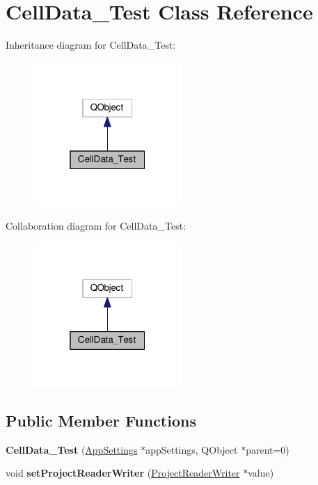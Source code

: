 \hypertarget{class_cell_data___test}{}\section{Cell\+Data\+\_\+\+Test Class Reference}
\label{class_cell_data___test}


Inheritance diagram for Cell\+Data\+\_\+\+Test\+:
\nopagebreak
\begin{figure}[H]
\begin{center}
\leavevmode
\includegraphics[width=160pt]{class_cell_data___test__inherit__graph}
\end{center}
\end{figure}


Collaboration diagram for Cell\+Data\+\_\+\+Test\+:
\nopagebreak
\begin{figure}[H]
\begin{center}
\leavevmode
\includegraphics[width=160pt]{class_cell_data___test__coll__graph}
\end{center}
\end{figure}
\subsection*{Public Member Functions}
\begin{DoxyCompactItemize}
\item 
{\bfseries Cell\+Data\+\_\+\+Test} (\hyperlink{class_app_settings}{App\+Settings} $\ast$app\+Settings, Q\+Object $\ast$parent=0)\hypertarget{class_cell_data___test_a90979511947668d5a7f6dc56ec19b0d8}{}\label{class_cell_data___test_a90979511947668d5a7f6dc56ec19b0d8}

\item 
void {\bfseries set\+Project\+Reader\+Writer} (\hyperlink{class_project_reader_writer}{Project\+Reader\+Writer} $\ast$value)\hypertarget{class_cell_data___test_ac76aa860bdb9f80976fd59632e423c0d}{}\label{class_cell_data___test_ac76aa860bdb9f80976fd59632e423c0d}

\end{DoxyCompactItemize}
